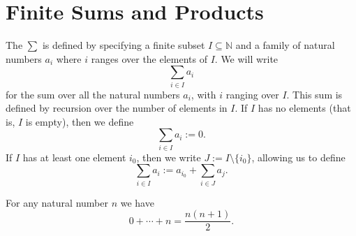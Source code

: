 \section{Finite Sums and Products}

\begin{definition}
  The  $\sum$ is defined by specifying a finite subset $I\subseteq \mathbb{N}$ and a family of natural numbers $a_i$ where $i$ ranges over the elements of $I$. We will write
  \begin{equation*}
    \sum_{i\in I}a_i
  \end{equation*}
  for the sum over all the natural numbers $a_i$, with $i$ ranging over $I$. This sum is defined by recursion over the number of elements in $I$. If $I$ has no elements (that is, $I$ is empty), then we define
  \begin{equation*}
    \sum_{i\in I}a_i := 0.
  \end{equation*}
  If $I$ has at least one element $i_0$, then we write $J:=I\setminus\{i_0\}$, allowing us to define
  \begin{equation*}
    \sum_{i\in I}a_i := a_{i_0}+\sum_{i\in J}a_j.
  \end{equation*}
\end{definition}

\begin{theorem}
  For any natural number $n$ we have
  \begin{equation*}
    0 + \cdots + n = \frac{n(n+1)}{2}.
  \end{equation*}
\end{theorem}

